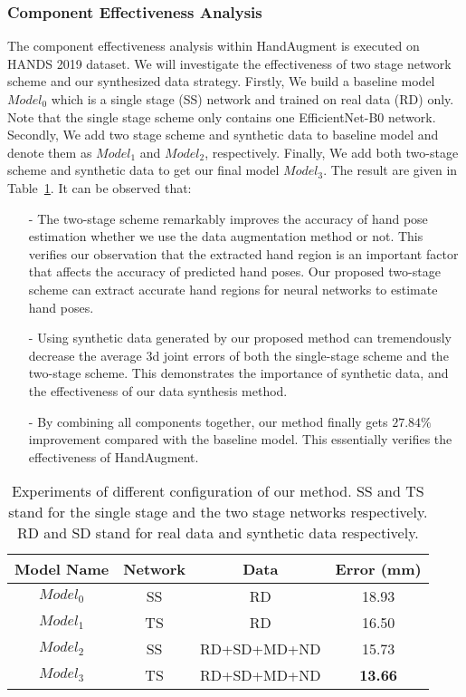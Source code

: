 \documentclass{article}
\begin{document}
\subsubsection{Component Effectiveness Analysis}
The component effectiveness analysis within HandAugment is executed on HANDS 2019 dataset. We will investigate the effectiveness of two stage network scheme and our synthesized data strategy. 
Firstly, We build a baseline model $Model_0$ which is a single stage (SS) network and trained on real data (RD) only. Note that the single stage scheme only contains one EfficientNet-B0 network.
Secondly, We add two stage scheme and synthetic data to baseline model and denote them as $Model_1$ and $Model_2$, respectively.
Finally, We add both two-stage scheme and synthetic data to get our final model $Model_3$.
The result are given in Table~\ref{tab:ablation_all}.
It can be observed that:
\begin{itemize}
\item[-] The two-stage scheme remarkably improves the accuracy of hand pose estimation whether we use the data augmentation method or not. This verifies our observation that the extracted hand region is an important factor that affects the accuracy of predicted hand poses. Our proposed two-stage scheme can extract accurate hand regions for neural networks to estimate hand poses.
\item[-] Using synthetic data generated by our proposed method can tremendously decrease the average 3d joint errors of both the single-stage scheme and the two-stage scheme. This demonstrates the importance of synthetic data, and the effectiveness of our data synthesis method. 
\item[-] By combining all components together, our method finally gets $27.84\%$ improvement compared with the baseline model. This essentially verifies the effectiveness of HandAugment.
\end{itemize}


\begin{table}
\centering
\begin{tabular}{cccc}
\hline
Model Name & Network & Data & Error (mm) \\ \hline
$Model_0$ & SS & RD  & 18.93 \\ \hline
$Model_1$ & TS & RD & 16.50 \\ \hline
$Model_2$ & SS & RD+SD+MD+ND & 15.73 \\ \hline
$Model_3$ & TS & RD+SD+MD+ND & \textbf{13.66} \\
\hline
\end{tabular}	\caption{\label{tab:ablation_all} Experiments of different configuration of our method. SS and TS stand for the single stage and the two stage networks respectively. RD and SD stand for real data and synthetic data respectively.}
\end{table}
\end{document}
